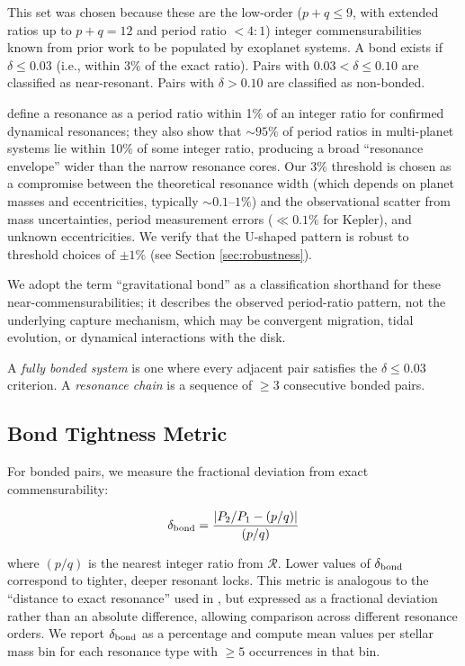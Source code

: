 \documentclass[twocolumn,usenatbib]{mnras}
\begin{document}
This set was chosen because these are the low-order ($p+q \leq 9$, with
extended ratios up to $p+q = 12$ and period ratio $< 4:1$) integer
commensurabilities known from prior work to be populated by exoplanet
systems\citep{fabrycky2014,mills2016}. A bond exists if $\delta \leq 0.03$
(i.e., within 3\% of the exact ratio). Pairs with $0.03 < \delta \leq 0.10$
are classified as near-resonant. Pairs with $\delta > 0.10$ are classified as
non-bonded.

\citet{mills2016} define a resonance as a period ratio within 1\% of an
integer ratio for confirmed dynamical resonances; they also show that $\sim
95\%$ of period ratios in multi-planet systems lie within 10\% of some integer
ratio, producing a broad ``resonance envelope'' wider than the narrow
resonance cores. Our 3\% threshold is chosen as a compromise between the
theoretical resonance width (which depends on planet masses and eccentricities,
typically $\sim 0.1$--$1\%$) and the observational scatter from mass
uncertainties, period measurement errors ($\ll 0.1\%$ for Kepler), and
unknown eccentricities. We verify that the U-shaped pattern is robust to
threshold choices of $\pm 1\%$ (see Section \ref{sec:robustness}).

We adopt the term ``gravitational bond'' as a classification shorthand for
these near-commensurabilities; it describes the observed period-ratio pattern,
not the underlying capture mechanism, which may be convergent migration,
tidal evolution, or dynamical interactions with the disk\citep{goldreich_tremaine1980}.

A \textit{fully bonded system} is one where every adjacent pair satisfies the
$\delta \leq 0.03$ criterion. A \textit{resonance chain} is a sequence of
$\geq 3$ consecutive bonded pairs.

\subsection{Bond Tightness Metric}
\label{sec:tightness}

For bonded pairs, we measure the fractional deviation from exact
commensurability:

\begin{equation}
\delta_{\rm bond} = \frac{|P_2/P_1 - (p/q)|}{(p/q)}
\label{eq:tightness}
\end{equation}

where $(p/q)$ is the nearest integer ratio from $\mathcal{R}$. Lower values of
$\delta_{\rm bond}$ correspond to tighter, deeper resonant locks. This metric
is analogous to the ``distance to exact resonance'' used in
\citet{fabrycky2014}, but expressed as a fractional deviation rather than an
absolute difference, allowing comparison across different resonance orders. We
report $\delta_{\rm bond}$ as a percentage and compute mean values per stellar
mass bin for each resonance type with $\geq 5$ occurrences in that bin.
\end{document}
